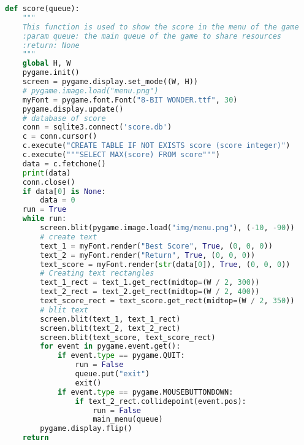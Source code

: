 \documentclass[12pt]{report}			%
\begin{document}
\begin{appendices}
\begin{lstlisting}[title={Program hra.py}, caption={hra.py},  label={lst:hra}, language=Python]
def score(queue):
    """
    This function is used to show the score in the menu of the game
    :param queue: the main queue of the game to share resources
    :return: None
    """
    global H, W
    pygame.init()
    screen = pygame.display.set_mode((W, H))
    # pygame.image.load("menu.png")
    myFont = pygame.font.Font("8-BIT WONDER.ttf", 30)
    pygame.display.update()
    # database of score
    conn = sqlite3.connect('score.db')
    c = conn.cursor()
    c.execute("CREATE TABLE IF NOT EXISTS score (score integer)")
    c.execute("""SELECT MAX(score) FROM score""")
    data = c.fetchone()
    print(data)
    conn.close()
    if data[0] is None:
        data = 0
    run = True
    while run:
        screen.blit(pygame.image.load("img/menu.png"), (-10, -90))
        # create text
        text_1 = myFont.render("Best Score", True, (0, 0, 0))
        text_2 = myFont.render("Return", True, (0, 0, 0))
        text_score = myFont.render(str(data[0]), True, (0, 0, 0))
        # Creating text rectangles
        text_1_rect = text_1.get_rect(midtop=(W / 2, 300))
        text_2_rect = text_2.get_rect(midtop=(W / 2, 400))
        text_score_rect = text_score.get_rect(midtop=(W / 2, 350))
        # blit text
        screen.blit(text_1, text_1_rect)
        screen.blit(text_2, text_2_rect)
        screen.blit(text_score, text_score_rect)
        for event in pygame.event.get():
            if event.type == pygame.QUIT:
                run = False
                queue.put("exit")
                exit()
            if event.type == pygame.MOUSEBUTTONDOWN:
                if text_2_rect.collidepoint(event.pos):
                    run = False
                    main_menu(queue)
        pygame.display.flip()
    return



\end{lstlisting}
\end{appendices}
\end{document}
